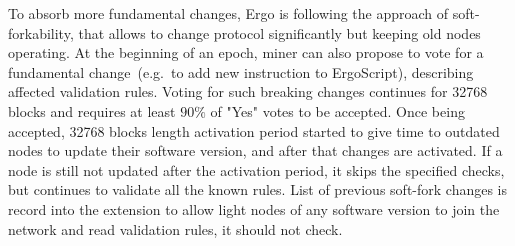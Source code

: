 To absorb more fundamental changes, Ergo is following the approach of soft-forkability, that
allows to change protocol significantly but keeping old nodes operating.
At the beginning of an epoch, miner can also propose to vote for a fundamental change~(e.g.~to
add new instruction to ErgoScript), describing affected validation rules.
Voting for such breaking changes continues for 32768 blocks and requires at least $90\%$ of
"Yes" votes to be accepted.
Once being accepted, 32768 blocks length activation period started to give time to outdated
nodes to update their software version, and after that changes are activated.
If a node is still not updated after the activation period, it skips the specified checks,
but continues to validate all the known rules.
List of previous soft-fork changes is record into the extension to allow light nodes of
any software version to join the network and read validation rules, it should not check.
